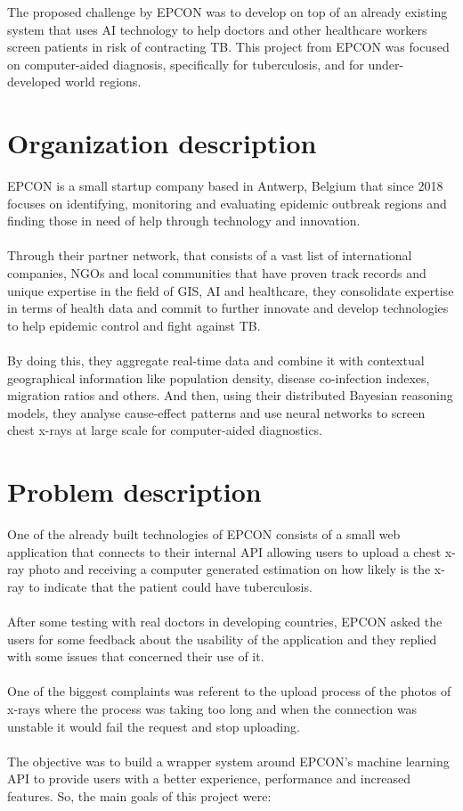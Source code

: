 

The proposed challenge by EPCON was to develop on top of an already existing system that uses AI technology to help doctors and other healthcare workers screen patients in risk of contracting TB. This project from EPCON was focused on computer-aided diagnosis, specifically for tuberculosis, and for under-developed world regions.

\section{Organization description}

EPCON is a small startup company based in Antwerp, Belgium that since 2018 focuses on identifying, monitoring and evaluating epidemic outbreak regions and finding those in need of help through technology and innovation.
\\ \\
Through their partner network, that consists of a vast list of international companies, NGOs and local communities that have proven track records and unique expertise in the field of GIS, AI and healthcare, they consolidate expertise in terms of health data and commit to further innovate and develop technologies to help epidemic control and fight against TB.
\\ \\
By doing this, they aggregate real-time data and combine it with contextual geographical information like population density, disease co-infection indexes, migration ratios and others. And then, using their distributed Bayesian reasoning models, they analyse cause-effect patterns and use neural networks to screen chest x-rays at large scale for computer-aided diagnostics. \cite{EPCON}

\section{Problem description}

One of the already built technologies of EPCON consists of a small web application that connects to their internal API allowing users to upload a chest x-ray photo and receiving a computer generated estimation on how likely is the x-ray to indicate that the patient could have tuberculosis.
\\ \\
After some testing with real doctors in developing countries, EPCON asked the users for some feedback about the usability of the application and they replied with some issues that concerned their use of it.
\\ \\
One of the biggest complaints was referent to the upload process of the photos of x-rays where the process was taking too long and when the connection was unstable it would fail the request and stop uploading.
\\ \\
The objective was to build a wrapper system around EPCON's machine learning API to provide users with a better experience, performance and increased features. So, the main goals of this project were:

